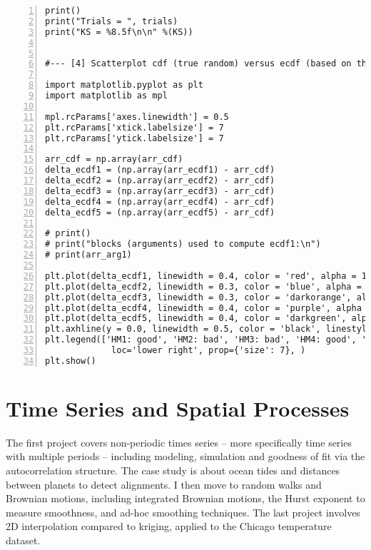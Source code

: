 \documentclass[oneside,10pt]{book}
\begin{document}
\begin{lstlisting}[numbers=left]
print()
print("Trials = ", trials)
print("KS = %8.5f\n\n" %(KS))


#--- [4] Scatterplot cdf (true random) versus ecdf (based on the two PRNGs) 

import matplotlib.pyplot as plt
import matplotlib as mpl

mpl.rcParams['axes.linewidth'] = 0.5
plt.rcParams['xtick.labelsize'] = 7
plt.rcParams['ytick.labelsize'] = 7

arr_cdf = np.array(arr_cdf) 
delta_ecdf1 = (np.array(arr_ecdf1) - arr_cdf) 
delta_ecdf2 = (np.array(arr_ecdf2) - arr_cdf) 
delta_ecdf3 = (np.array(arr_ecdf3) - arr_cdf) 
delta_ecdf4 = (np.array(arr_ecdf4) - arr_cdf) 
delta_ecdf5 = (np.array(arr_ecdf5) - arr_cdf) 

# print()
# print("blocks (arguments) used to compute ecdf1:\n")
# print(arr_arg1)

plt.plot(delta_ecdf1, linewidth = 0.4, color = 'red', alpha = 1)
plt.plot(delta_ecdf2, linewidth = 0.3, color = 'blue', alpha = 0.5)
plt.plot(delta_ecdf3, linewidth = 0.3, color = 'darkorange', alpha = 1)
plt.plot(delta_ecdf4, linewidth = 0.4, color = 'purple', alpha = 1)
plt.plot(delta_ecdf5, linewidth = 0.4, color = 'darkgreen', alpha = 1)
plt.axhline(y = 0.0, linewidth = 0.5, color = 'black', linestyle = 'dashed')
plt.legend(['HM1: good', 'HM2: bad', 'HM3: bad', 'HM4: good', 'Numpy'], 
             loc='lower right', prop={'size': 7}, )
plt.show()
\end{lstlisting}

\chapter{Time Series and Spatial Processes}\label{tschj}

The first project covers non-periodic times series -- more specifically time series with multiple periods -- including modeling, simulation and 
 goodness of fit via the autocorrelation structure. The case study is about ocean tides and distances between planets to detect alignments. 
I then move to random walks and Brownian motions, including integrated Brownian motions, the Hurst exponent to measure smoothness, 
 and ad-hoc smoothing techniques. The last project involves 2D interpolation compared to kriging, applied to the Chicago temperature dataset. 

\end{document}
